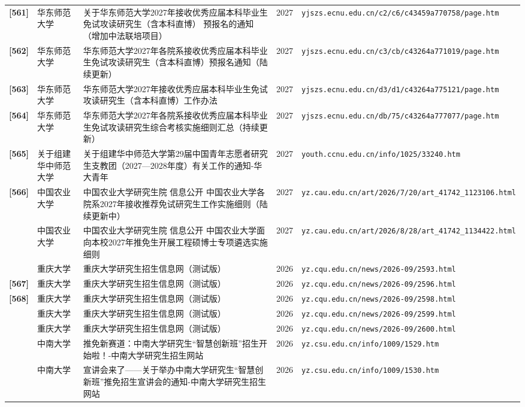 {\begin{longtable}{@{}p{1.15cm}p{2.9cm}p{6.3cm}p{0.85cm}p{5.0cm}@{}}
\textbf{[561]} & 华东师范大学 & 关于华东师范大学2027年接收优秀应届本科毕业生免试攻读研究生（含本科直博） 预报名的通知（增加中法联培项目） & 2027 & \texttt{yjszs.ecnu.edu.cn/c2/c6/c43459a770758/page.htm} \\
\textbf{[562]} & 华东师范大学 & 华东师范大学2027年各院系接收优秀应届本科毕业生免试攻读研究生（含本科直博）预报名通知（陆续更新） & 2027 & \texttt{yjszs.ecnu.edu.cn/c3/cb/c43264a771019/page.htm} \\
\textbf{[563]} & 华东师范大学 & 华东师范大学2027年接收优秀应届本科毕业生免试攻读研究生（含本科直博）工作办法 & 2027 & \texttt{yjszs.ecnu.edu.cn/d3/d1/c43264a775121/page.htm} \\
\textbf{[564]} & 华东师范大学 & 华东师范大学2027年各院系接收优秀应届本科毕业生免试攻读研究生综合考核实施细则汇总（持续更新） & 2027 & \texttt{yjszs.ecnu.edu.cn/db/75/c43264a777077/page.htm} \\
\textbf{[565]} & 关于组建华中师范大学 & 关于组建华中师范大学第29届中国青年志愿者研究生支教团（2027—2028年度）有关工作的通知-华大青年 & 2027 & \texttt{youth.ccnu.edu.cn/info/1025/33240.htm} \\
\textbf{[566]} & 中国农业大学 & 中国农业大学研究生院 信息公开 中国农业大学各院系2027年接收推荐免试研究生工作实施细则（陆续更新中） & 2027 & \texttt{yz.cau.edu.cn/art/2026/7/20/art\_41742\_1123106.html} \\
[0] & 中国农业大学 & 中国农业大学研究生院 信息公开 中国农业大学面向本校2027年推免生开展工程硕博士专项遴选实施细则 & 2027 & \texttt{yz.cau.edu.cn/art/2026/8/28/art\_41742\_1134422.html} \\
[0] & 重庆大学 & 重庆大学研究生招生信息网（测试版） & 2026 & \texttt{yz.cqu.edu.cn/news/2026-09/2593.html} \\
\textbf{[567]} & 重庆大学 & 重庆大学研究生招生信息网（测试版） & 2026 & \texttt{yz.cqu.edu.cn/news/2026-09/2596.html} \\
\textbf{[568]} & 重庆大学 & 重庆大学研究生招生信息网（测试版） & 2026 & \texttt{yz.cqu.edu.cn/news/2026-09/2598.html} \\
[0] & 重庆大学 & 重庆大学研究生招生信息网（测试版） & 2026 & \texttt{yz.cqu.edu.cn/news/2026-09/2599.html} \\
[0] & 重庆大学 & 重庆大学研究生招生信息网（测试版） & 2026 & \texttt{yz.cqu.edu.cn/news/2026-09/2600.html} \\
[0] & 中南大学 & 推免新赛道：中南大学研究生“智慧创新班”招生开始啦！-中南大学研究生招生网站 & 2026 & \texttt{yz.csu.edu.cn/info/1009/1529.htm} \\
[0] & 中南大学 & 宣讲会来了——关于举办中南大学研究生“智慧创新班”推免招生宣讲会的通知-中南大学研究生招生网站 & 2026 & \texttt{yz.csu.edu.cn/info/1009/1530.htm} \\

\end{longtable}}
